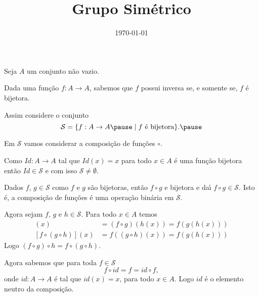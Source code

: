 \documentclass{beamer}
\title{Grupo Sim\'etrico}
\author[\autor]{\autor}
\institute[\instituto]{\instituto}
\date{\today}
\begin{document}
    \begin{frame}
        \maketitle
    \end{frame}


    \begin{frame}
        Seja $A$ um conjunto n\~ao vazio.\pause

        \vspace{.3cm}

        Dada uma fun\c{c}\~ao $f : A \to A$, sabemos que $f$ possui inversa \pause se, e somente se, $f$ \'e bijetora.\pause

        \vspace{.3cm}

        Assim considere o conjunto\pause
        \[
            \mathcal{S} = \{ f : A \to A \pause \mid f \mbox{ \'e bijetora}\}.\pause
        \]
        
        \vspace{.3cm}

        Em $\mathcal{S}$ vamos considerar a composi\c{c}\~ao de fun\c{c}\~oes $\circ$. 

        \vspace{.3cm}

        Como $Id : A \to A$ tal que $Id(x) = x$ para todo $x \in A$ \'e uma fun\c{c}\~ao bijetora ent\~ao $Id \in \mathcal{S}$ e com isso $\mathcal{S} \ne \emptyset$. 
    \end{frame}

    \begin{frame}
        Dados $f$, $g \in \mathcal{S}$ como $f$ e $g$ s\~ao bijetoras, ent\~ao $f \circ g$ e bijetora e da{\'\i} $f \circ g \in \mathcal{S}$. Isto \'e, a composi\c{c}\~ao de fun\c{c}\~oes \'e uma opera\c{c}\~ao bin\'aria em $\mathcal{S}$.

        \vspace{.3cm}

        Agora sejam $f$, $g$ e $h \in \mathcal{S}$. Para todo $x \in A$ temos
        \begin{align*}
            [(f\circ g)\circ h](x) &= (f \circ g)(h(x)) = f(g(h(x)))\\
            [f\circ(g\circ h)](x) &= f((g\circ h)(x)) = f(g(h(x)))
        \end{align*}
        Logo $(f\circ g)\circ h = f\circ(g\circ h)$.

        \vspace{.3cm}

        Agora sabemos que para toda $f \in \mathcal{S}$
        \[
            f\circ id = f = id\circ f,
        \]
        onde $id : A \to A$ \'e tal que $id(x) = x$, para todo $x \in A$. Logo $id$ \'e o elemento neutro da composi\c{c}\~ao.

    \end{frame}
\end{document}
